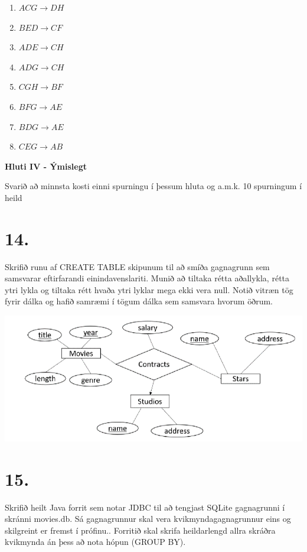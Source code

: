 \documentclass{article}
\newcommand{\bo}[1]{\textbf{#1}}
\newcommand{\enum}{\begin{enumerate}[label = \alph*.]}
\begin{document}
\enum
\item $ACG \rightarrow DH$
\item $BED \rightarrow CF$
\item $ADE \rightarrow CH$
\item $ADG \rightarrow CH$
\item $CGH \rightarrow BF$
\item $BFG \rightarrow AE$
\item $BDG \rightarrow AE$
\item $CEG \rightarrow AB$
\end{enumerate}

\newpage

\begin{center}
    \bo{Hluti IV - Ýmislegt}

    Svarið að minnsta kosti einni spurningu í þessum hluta  og
    a.m.k. 10 spurningum í heild
\end{center}

\section{14.}
Skrifið runu af CREATE TABLE skipunum til að smíða gagnagrunn
sem samsvarar eftirfarandi einindavenslariti. Munið að tiltaka rétta
aðallykla, rétta ytri lykla og tiltaka rétt hvaða ytri lyklar mega ekki
vera null. Notið vitræn tög fyrir dálka og hafið samræmi í tögum
dálka sem samsvara hvorum öðrum.

\begin{center}
    \includegraphics[scale = 0.8]{myndir/mynd1.png}
\end{center}

\vspace{1cm}

\section{15.}
Skrifið heilt Java forrit sem notar JDBC til að tengjast SQLite
gagnagrunni í skránni movies.db. Sá gagnagrunnur skal vera
kvikmyndagagnagrunnur eins og skilgreint er fremst í prófinu..
Forritið skal skrifa heildarlengd allra skráðra kvikmynda án þess að
nota hópun (GROUP BY).
\end{document}
